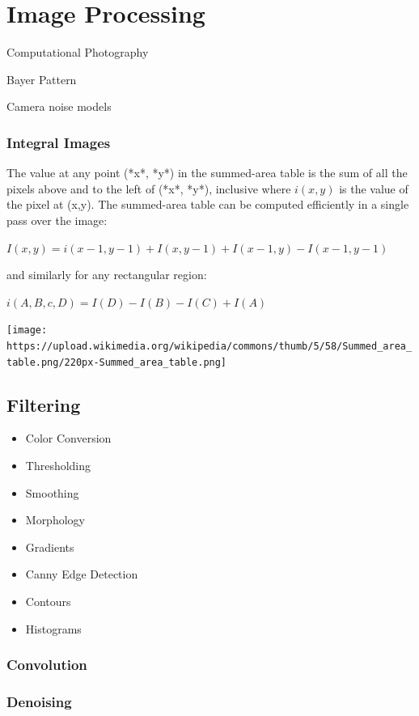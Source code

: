 \chapter{Image Processing}



Computational Photography

Bayer Pattern

Camera noise models

\subsection{Integral Images}


The value at any point (*x*, *y*) in the summed-area table is the sum of all the pixels above and to the left of (*x*, *y*), inclusive where $i(x,y)$  is the value of the pixel at (x,y). The summed-area table can be computed efficiently in a single pass over the image:

$I(x,y) = i(x-1,y-1) + I(x,y-1) + I(x-1,y)-I(x-1,y-1)$

and similarly for any rectangular region:

$ i(A,B,c,D) = I(D) - I(B) - I(C)+I(A)$

\texttt{[image: https://upload.wikimedia.org/wikipedia/commons/thumb/5/58/Summed\_area\_table.png/220px-Summed\_area\_table.png]}

\section{ Filtering}
\begin{itemize}
\item Color Conversion
\item Thresholding
\item Smoothing
\item Morphology
\item Gradients
\item Canny Edge Detection
\item Contours
\item Histograms
\end{itemize}

\subsection{Convolution}

\subsection{Denoising}

